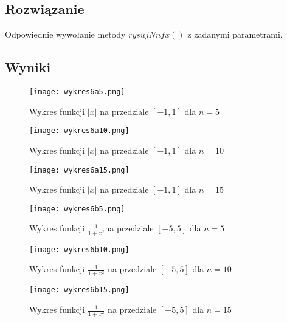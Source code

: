\documentclass{article}
\begin{document}
\subsection{Rozwiązanie}
Odpowiednie wywołanie metody $rysujNnfx()$ z zadanymi parametrami.
\subsection{Wyniki}
\begin{figure}[H]
\centering
\begin{minipage}{0.49\textwidth}
	
	\texttt{[image: wykres6a5.png]}
	\caption{Wykres funkcji $|x|$ \newline na przedziale $[-1,1]$  dla $n = 5$}
	
\end{minipage}
\begin{minipage}{0.49\textwidth}
	
	\texttt{[image: wykres6a10.png]}
	\caption{Wykres funkcji $|x|$ \newline na przedziale $[-1,1]$  dla $n =10$}
\end{minipage}
\end{figure}
\begin{figure}[H]
	\centering
	\begin{minipage}{0.49\textwidth}
		
		\texttt{[image: wykres6a15.png]}
		\caption{Wykres funkcji $|x|$ \newline na przedziale $[-1,1]$  dla $n =15$}
		
	\end{minipage}
	\begin{minipage}{0.49\textwidth}
		
		\texttt{[image: wykres6b5.png]}
		\caption{Wykres funkcji $\frac{1}{1+x^2}$\newline na przedziale $[-5,5]$  dla $n = 5$}
	\end{minipage}
\end{figure}
\begin{figure}[H]
	\centering
	\begin{minipage}{0.49\textwidth}
		
		\texttt{[image: wykres6b10.png]}
		\caption{Wykres funkcji $\frac{1}{1+x^2}$ \newline na przedziale $[-5,5]$  dla $n = 10$}
		
	\end{minipage}
	\begin{minipage}{0.49\textwidth}
		
		\texttt{[image: wykres6b15.png]}
		\caption{Wykres funkcji $ \frac{1}{1+x^2}$ \newline na przedziale $[-5,5]$  dla $n = 15$}
	\end{minipage}
\end{figure}
\end{document}
